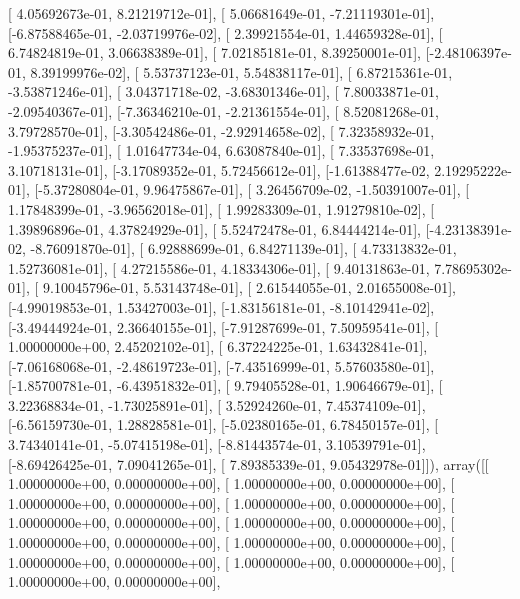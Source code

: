 \documentclass{article}
\begin{document}
       [ 4.05692673e-01,  8.21219712e-01],
       [ 5.06681649e-01, -7.21119301e-01],
       [-6.87588465e-01, -2.03719976e-02],
       [ 2.39921554e-01,  1.44659328e-01],
       [ 6.74824819e-01,  3.06638389e-01],
       [ 7.02185181e-01,  8.39250001e-01],
       [-2.48106397e-01,  8.39199976e-02],
       [ 5.53737123e-01,  5.54838117e-01],
       [ 6.87215361e-01, -3.53871246e-01],
       [ 3.04371718e-02, -3.68301346e-01],
       [ 7.80033871e-01, -2.09540367e-01],
       [-7.36346210e-01, -2.21361554e-01],
       [ 8.52081268e-01,  3.79728570e-01],
       [-3.30542486e-01, -2.92914658e-02],
       [ 7.32358932e-01, -1.95375237e-01],
       [ 1.01647734e-04,  6.63087840e-01],
       [ 7.33537698e-01,  3.10718131e-01],
       [-3.17089352e-01,  5.72456612e-01],
       [-1.61388477e-02,  2.19295222e-01],
       [-5.37280804e-01,  9.96475867e-01],
       [ 3.26456709e-02, -1.50391007e-01],
       [ 1.17848399e-01, -3.96562018e-01],
       [ 1.99283309e-01,  1.91279810e-02],
       [ 1.39896896e-01,  4.37824929e-01],
       [ 5.52472478e-01,  6.84444214e-01],
       [-4.23138391e-02, -8.76091870e-01],
       [ 6.92888699e-01,  6.84271139e-01],
       [ 4.73313832e-01,  1.52736081e-01],
       [ 4.27215586e-01,  4.18334306e-01],
       [ 9.40131863e-01,  7.78695302e-01],
       [ 9.10045796e-01,  5.53143748e-01],
       [ 2.61544055e-01,  2.01655008e-01],
       [-4.99019853e-01,  1.53427003e-01],
       [-1.83156181e-01, -8.10142941e-02],
       [-3.49444924e-01,  2.36640155e-01],
       [-7.91287699e-01,  7.50959541e-01],
       [ 1.00000000e+00,  2.45202102e-01],
       [ 6.37224225e-01,  1.63432841e-01],
       [-7.06168068e-01, -2.48619723e-01],
       [-7.43516999e-01,  5.57603580e-01],
       [-1.85700781e-01, -6.43951832e-01],
       [ 9.79405528e-01,  1.90646679e-01],
       [ 3.22368834e-01, -1.73025891e-01],
       [ 3.52924260e-01,  7.45374109e-01],
       [-6.56159730e-01,  1.28828581e-01],
       [-5.02380165e-01,  6.78450157e-01],
       [ 3.74340141e-01, -5.07415198e-01],
       [-8.81443574e-01,  3.10539791e-01],
       [-8.69426425e-01,  7.09041265e-01],
       [ 7.89385339e-01,  9.05432978e-01]]), array([[ 1.00000000e+00,  0.00000000e+00],
       [ 1.00000000e+00,  0.00000000e+00],
       [ 1.00000000e+00,  0.00000000e+00],
       [ 1.00000000e+00,  0.00000000e+00],
       [ 1.00000000e+00,  0.00000000e+00],
       [ 1.00000000e+00,  0.00000000e+00],
       [ 1.00000000e+00,  0.00000000e+00],
       [ 1.00000000e+00,  0.00000000e+00],
       [ 1.00000000e+00,  0.00000000e+00],
       [ 1.00000000e+00,  0.00000000e+00],
       [ 1.00000000e+00,  0.00000000e+00],
\end{document}
